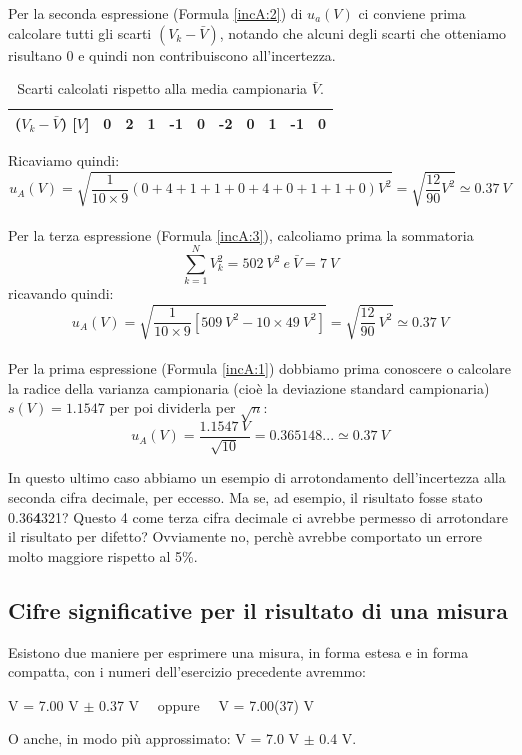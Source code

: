 \documentclass[a4paper,11pt]{report}
\begin{document}
Per la seconda espressione (Formula \ref{incA:2}) di $u_a(V)$ ci conviene prima calcolare tutti gli scarti $(V_k-\bar{V})$, notando che alcuni degli scarti che otteniamo risultano 0 e quindi non contribuiscono all'incertezza\footnotemark[1].
\begin{table}[H]
  \caption{Scarti calcolati rispetto alla media campionaria $\bar{V}$.}
  \label{tab:esIncertezza:scarti}

  \begin{center}
    \begin{tabular}{|l|c|r|r|r|r|r|r|r|r|r|}
    \hline
       ($V_k-\bar{V}$) [$V$]   & 0& 2& 1& -1& 0& -2& 0& 1& -1& 0 \\
    \hline
    \end{tabular}
  \end{center}
\end{table}
Ricaviamo quindi:
$$
  u_A(V) = \sqrt{\frac{1}{10\times 9}(0+4+1+1+0+4+0+1+1+0)V^2} = \sqrt{\frac{12}{90}V^2} \simeq 0.37\ V
$$
\\
Per la terza espressione (Formula \ref{incA:3}), calcoliamo prima la sommatoria
$$
  \sum^N_{k=1}V^2_k = 502\ V^2\ e\ \bar{V} = 7\ V
$$
ricavando quindi:
$$
  u_A(V) = \sqrt{\frac{1}{10\times 9}[509\ V^2 - 10 \times 49\ V^2]} = \sqrt{\frac{12}{90}\ V^2} \simeq 0.37\ V
$$
\\
Per la prima espressione (Formula \ref{incA:1}) dobbiamo prima conoscere o calcolare la radice della varianza campionaria (cioè la deviazione standard campionaria) $s(V) = 1.1547$ per poi dividerla per $\sqrt{n}$:
$$
  u_A(V) = \frac{1.1547\ V}{\sqrt{10}} = 0.365148... \simeq 0.37\ V
$$

In questo ultimo caso abbiamo un esempio di arrotondamento dell'incertezza alla seconda cifra decimale, per eccesso. Ma se, ad esempio, il risultato fosse stato 0.36\textbf{4}321? Questo 4 come terza cifra decimale ci avrebbe permesso di arrotondare il risultato per difetto? Ovviamente no, perchè avrebbe comportato un errore molto maggiore rispetto al 5\%.
\subsection{Cifre significative per il risultato di una misura}
Esistono due maniere per esprimere una misura, in forma estesa e in forma compatta, con i numeri dell'esercizio precedente avremmo:
\begin{center}
  V = 7.00 V $\pm$ 0.37 V~~ oppure~~ V = 7.00(37) V    
\end{center}
O anche, in modo più approssimato: V = 7.0 V $\pm$ 0.4 V.
\end{document}
